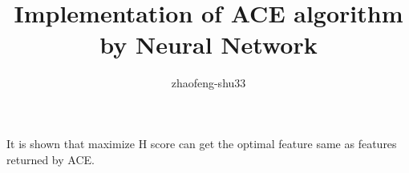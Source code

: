 \documentclass{article}
\begin{document}
\title{Implementation of ACE algorithm by Neural Network}
\author{zhaofeng-shu33}
\maketitle
It is shown that maximize H score can get the optimal feature same as features returned by ACE.
\end{document}
